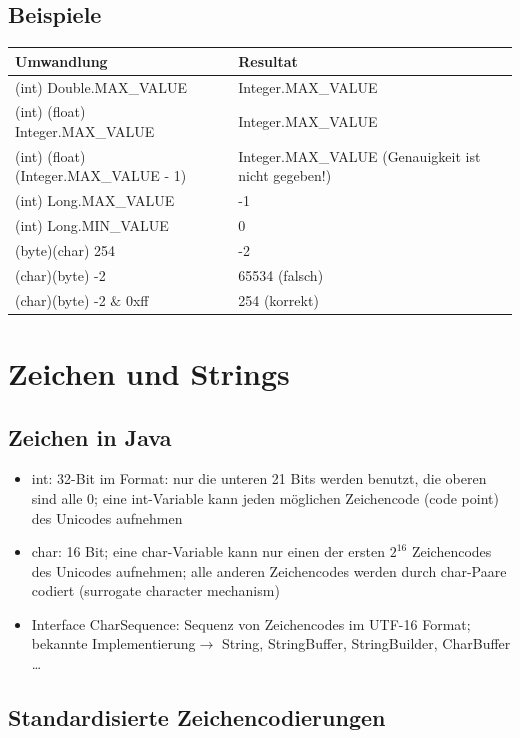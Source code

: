 \documentclass[a4paper,10pt]{article}
\newcommand{\Bold}[1]{\textbf{#1}} %
\newcommand{\ra}{\rightarrow}
\begin{document}
\subsection{Beispiele}
\begin{tabular}{|l|l|}
\hline
\Bold{Umwandlung}&\Bold{Resultat}\\\hline\hline

(int) Double.MAX\_VALUE & Integer.MAX\_VALUE \\\hline
(int) (float) Integer.MAX\_VALUE & Integer.MAX\_VALUE \\\hline
(int) (float) (Integer.MAX\_VALUE - 1) & Integer.MAX\_VALUE (Genauigkeit ist nicht gegeben!)\\\hline
(int) Long.MAX\_VALUE & -1\\\hline
(int) Long.MIN\_VALUE & 0 \\\hline

(byte)(char) 254 & -2 \\\hline
(char)(byte) -2 & 65534 (falsch) \\\hline
(char)(byte) -2 $\&$ 0xff & 254 (korrekt) \\\hline
\hline
\end{tabular}



\pagebreak
\section{Zeichen und Strings}
\subsection{Zeichen in Java}
\begin{itemize}
\item int: 32-Bit im Format: nur die unteren 21 Bits werden benutzt, die oberen sind alle 0; eine int-Variable kann jeden m\"oglichen Zeichencode (code point) des Unicodes aufnehmen
\item char: 16 Bit; eine char-Variable kann nur einen der ersten $2^{16}$ Zeichencodes des Unicodes aufnehmen; alle anderen Zeichencodes werden durch char-Paare codiert (surrogate character mechanism)
\item Interface CharSequence: Sequenz von Zeichencodes im UTF-16 Format; bekannte Implementierung$\ra$ String, StringBuffer, StringBuilder, CharBuffer \ldots
\end{itemize}

\subsection{Standardisierte Zeichencodierungen}
\end{document}
